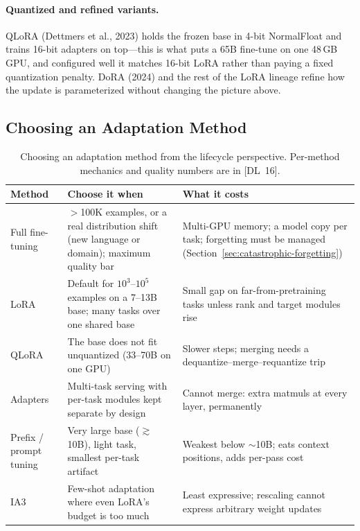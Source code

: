 \paragraph{Quantized and refined variants.}
\label{sec:qlora}
\label{sec:dora}
QLoRA (Dettmers et al., 2023) holds the frozen base in 4-bit NormalFloat and
trains 16-bit adapters on top---this is what puts a 65B fine-tune on one
48\,GB GPU, and configured well it matches 16-bit LoRA rather than paying a
fixed quantization penalty.  DoRA (2024) and the rest of the LoRA lineage
refine how the update is parameterized without changing the picture above.

\subsection{Choosing an Adaptation Method}

\begin{table}[H]
\centering
\small
\begin{tabularx}{\textwidth}{@{}l X X@{}}
\toprule
\textbf{Method} & \textbf{Choose it when} & \textbf{What it costs} \\
\midrule
Full fine-tuning & $>$100K examples, or a real distribution shift (new
  language or domain); maximum quality bar &
  Multi-GPU memory; a model copy per task; forgetting must be managed
  (Section~\ref{sec:catastrophic-forgetting}) \\
LoRA & Default for $10^3$--$10^5$ examples on a 7--13B base; many tasks over
  one shared base &
  Small gap on far-from-pretraining tasks unless rank and target modules rise \\
QLoRA & The base does not fit unquantized (33--70B on one GPU) &
  Slower steps; merging needs a dequantize--merge--requantize trip \\
Adapters & Multi-task serving with per-task modules kept separate by design &
  Cannot merge: extra matmuls at every layer, permanently \\
Prefix / prompt tuning & Very large base ($\gtrsim$10B), light task, smallest
  per-task artifact &
  Weakest below $\sim$10B; eats context positions, adds per-pass cost \\
IA3 & Few-shot adaptation where even LoRA's budget is too much &
  Least expressive; rescaling cannot express arbitrary weight updates \\
\bottomrule
\end{tabularx}
\caption{Choosing an adaptation method from the lifecycle perspective.
Per-method mechanics and quality numbers are in [DL~16].}
\label{tab:peft-comparison}
\end{table}

